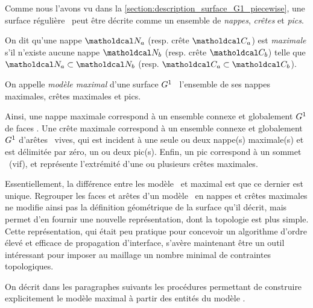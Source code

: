 Comme nous l'avons vu dans la \autoref{section:description_surface_G1_piecewise}, une surface régulière \piecewise\ peut être décrite comme un ensemble de \textit{nappes}, \textit{crêtes} et \textit{pics}. \par 

\begin{definition}
	On dit qu'une nappe $\nappe_a$ (resp. crête $\crete_a$) est \emph{maximale} s'il n'existe aucune nappe $\nappe_b$ (resp. crête $\crete_b$) telle que $\nappe_a \subset \nappe_b$ (resp. $\crete_a \subset \crete_b$). \par
	On appelle \emph{modèle maximal} d'une surface $G^{1}$ \piecewise\ l'ensemble de ses nappes maximales, crêtes maximales et pics.
\end{definition}

Ainsi, une nappe maximale correspond à un ensemble connexe et globalement $G^{1}$ de faces \brep. 
Une crête maximale correspond à un ensemble connexe et globalement $G^{1}$ d'arêtes \brep\ vives, qui est incident à une seule ou deux nappe(s) maximale(s) et est délimitée par zéro, un ou deux pic(s).
Enfin, un pic correspond à un sommet \brep\ (vif), et représente l'extrémité d'une ou plusieurs crêtes maximales.\par
Essentiellement, la différence entre les modèle \brep\ et maximal est que ce dernier est unique. 
Regrouper les faces et arêtes d'un modèle \brep\ en nappes et crêtes maximales ne modifie ainsi pas la définition géométrique de la surface qu'il décrit, mais permet d'en fournir une nouvelle représentation, dont la topologie est plus simple. 
Cette représentation, qui était peu pratique pour concevoir un algorithme d'ordre élevé et efficace de propagation d'interface, s'avère maintenant être un outil intéressant pour imposer au maillage un nombre minimal de contraintes topologiques.\par
On décrit dans les paragraphes suivants les procédures permettant de construire explicitement le modèle maximal à partir des entités du modèle \brep.

